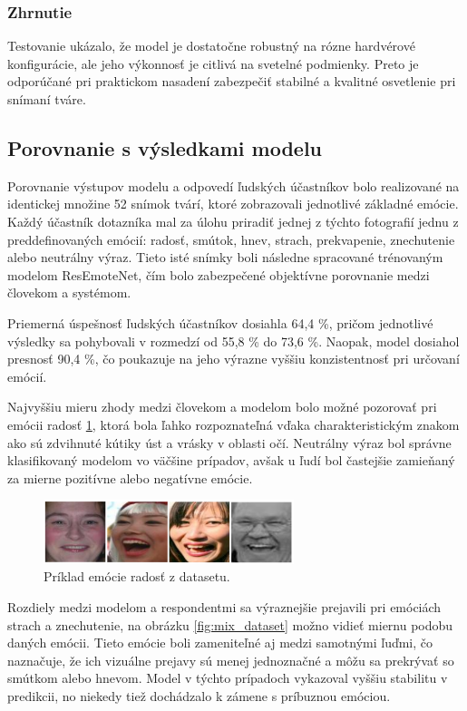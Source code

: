 \subsubsection{Zhrnutie}
Testovanie uk\'azalo, \v{z}e model je dostato\v{c}ne robustn\'y na r\'ozne hardv\'erov\'e konfigur\'acie, ale jeho v\'ykonnos\v{t} je citliv\'a na sveteln\'e podmienky. Preto je odpor\'u\v{c}an\'e pri praktickom nasaden\'i zabezpe\v{c}i\v{t} stabiln\'e a kvalitn\'e osvetlenie pri sn\'iman\'i tv\'are.

\subsection{Porovnanie s výsledkami modelu}

Porovnanie výstupov modelu a odpovedí ľudských účastníkov bolo realizované na identickej množine 52 snímok tvárí, ktoré zobrazovali jednotlivé základné emócie. Každý účastník dotazníka mal za úlohu priradiť jednej z týchto fotografií jednu z preddefinovaných emócií: radosť, smútok, hnev, strach, prekvapenie, znechutenie alebo neutrálny výraz. Tieto isté snímky boli následne spracované trénovaným modelom ResEmoteNet, čím bolo zabezpečené objektívne porovnanie medzi človekom a systémom.

Priemerná úspešnosť ľudských účastníkov dosiahla 64,4 \%, pričom jednotlivé výsledky sa pohybovali v rozmedzí od 55,8 \% do 73,6 \%. Naopak, model dosiahol presnosť 90,4 \%, čo poukazuje na jeho výrazne vyššiu konzistentnosť pri určovaní emócií.

Najvyššiu mieru zhody medzi človekom a modelom bolo možné pozorovať pri emócii radosť \ref{fig:happy_dataset}, ktorá bola ľahko rozpoznateľná vďaka charakteristickým znakom ako sú zdvihnuté kútiky úst a vrásky v oblasti očí. Neutrálny výraz bol správne klasifikovaný modelom vo väčšine prípadov, avšak u ľudí bol častejšie zamieňaný za mierne pozitívne alebo negatívne emócie.

\begin{figure}[!htpb]
    \centering
    \includegraphics[width=0.65\textwidth]{img/stastny_dataset.png}
    \caption{Príklad emócie radosť z datasetu.}
    \label{fig:happy_dataset}
\end{figure}
\newpage
Rozdiely medzi modelom a respondentmi sa výraznejšie prejavili pri emóciách strach a znechutenie, na obrázku \ref{fig:mix_dataset} možno vidieť miernu podobu daných emócii. Tieto emócie boli zameniteľné aj medzi samotnými ľuďmi, čo naznačuje, že ich vizuálne prejavy sú menej jednoznačné a môžu sa prekrývať so smútkom alebo hnevom. Model v týchto prípadoch vykazoval vyššiu stabilitu v predikcii, no niekedy tiež dochádzalo k zámene s príbuznou emóciou.

